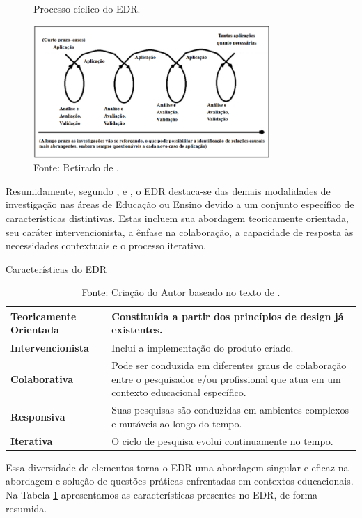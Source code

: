 \begin{figure}[H]
\caption{Processo cíclico do EDR.}
  \label{fig:mattaeboa}
  \centering
  \includegraphics[width=0.8\textwidth]{fig/mattaeboa.png}
  \caption*{Fonte: Retirado de .}
\end{figure}

Resumidamente, segundo \cite{alves2018}, \cite{MATTA2014} e \cite{McKenney2018}, o EDR destaca-se das demais modalidades de investigação nas áreas de Educação ou Ensino devido a um conjunto específico de características distintivas. Estas incluem sua abordagem teoricamente orientada, seu caráter intervencionista, a ênfase na colaboração, a capacidade de resposta às necessidades contextuais e o processo iterativo. 

\begin{table}[H]
\centering
\caption{Características do EDR} \label{tab:carctEDR}
\begin{tabular}{p{5.8cm} p{6.7cm}}
\hline 
\textbf{Teoricamente Orientada} & Constituída a partir dos princípios de design já existentes.\\ 
\hline 
\textbf{Intervencionista} & Inclui a implementação do produto criado.\\ 
\hline 
\textbf{Colaborativa} & Pode ser conduzida em diferentes graus de colaboração entre o pesquisador e/ou profissional que atua em um contexto educacional específico.\\ 
\hline 
\textbf{Responsiva} & Suas pesquisas são conduzidas em ambientes complexos e mutáveis ao longo do tempo.\\ 
\hline 
\textbf{Iterativa} & O ciclo de pesquisa evolui continuamente no tempo.\\ 
\hline 
\end{tabular}
\caption*{Fonte: Criação do Autor baseado no texto de .}
\end{table}

Essa diversidade de elementos torna o EDR uma abordagem singular e eficaz na abordagem e solução de questões práticas enfrentadas em contextos educacionais. Na Tabela \ref{tab:carctEDR} apresentamos as características presentes no EDR, de forma resumida.

